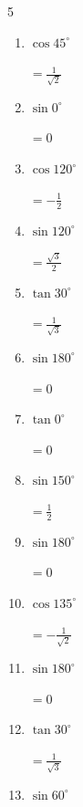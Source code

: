 \begin{multicols}{5}
\begin{enumerate}
        $\displaystyle =-\frac{\sqrt{3}}{2}$

  \item $\displaystyle \cos{45^\circ}$

        $\displaystyle =\frac{1}{\sqrt{2}}$

  \item $\displaystyle \sin{0^\circ}$

        $\displaystyle =0$

  \item $\displaystyle \cos{120^\circ}$

        $\displaystyle =-\frac{1}{2}$

  \item $\displaystyle \sin{120^\circ}$

        $\displaystyle =\frac{\sqrt{3}}{2}$

  \item $\displaystyle \tan{30^\circ}$

        $\displaystyle =\frac{1}{\sqrt{3}}$

  \item $\displaystyle \sin{180^\circ}$

        $\displaystyle =0$

  \item $\displaystyle \tan{0^\circ}$

        $\displaystyle =0$

\columnbreak %

  \item $\displaystyle \sin{150^\circ}$

        $\displaystyle =\frac{1}{2}$

  \item $\displaystyle \sin{180^\circ}$

        $\displaystyle =0$

  \item $\displaystyle \cos{135^\circ}$

        $\displaystyle =-\frac{1}{\sqrt{2}}$

  \item $\displaystyle \sin{180^\circ}$

        $\displaystyle =0$

  \item $\displaystyle \tan{30^\circ}$

        $\displaystyle =\frac{1}{\sqrt{3}}$

  \item $\displaystyle \sin{60^\circ}$


\end{enumerate}
\end{multicols}
